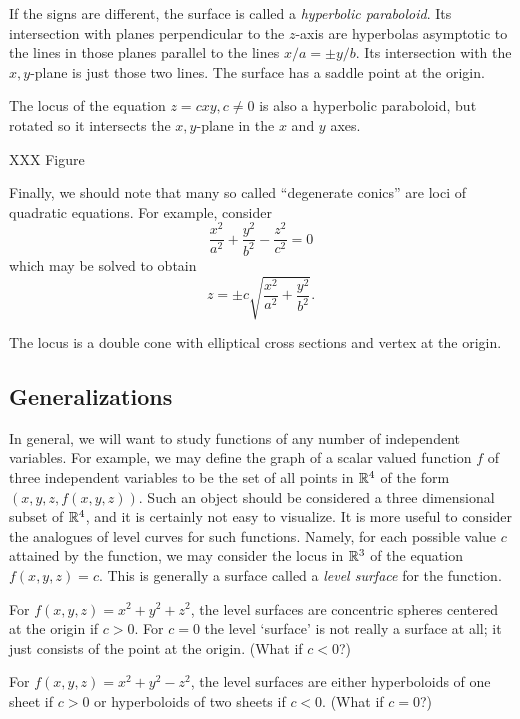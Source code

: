 If the signs are different, the surface is called a {\it
hyperbolic paraboloid}.  Its intersection with planes perpendicular
to the $z$-axis are hyperbolas asymptotic to the lines in
those planes parallel to the lines $x/a = \pm y/b$.   Its intersection
with the $x,y$-plane is just those two lines.  The surface has
a saddle point at the origin.


The locus of the equation $z = cxy, c\not= 0$ is also a hyperbolic
paraboloid, but rotated so it intersects the $x,y$-plane in the
$x$ and $y$ axes. 

XXX Figure

Finally, we should note that many so called ``degenerate conics''
are loci of quadratic equations.   For example, consider
\[
    \frac{x^2}{a^2} + \frac{y^2}{b^2} - \frac{z^2}{c^2} = 0
\]
which may be solved to obtain
\[
   z = \pm c\sqrt{\frac{x^2}{a^2} + \frac{y^2}{b^2}}. 
\]

The locus is a double cone with elliptical cross sections and
vertex at the origin.  

\subsection{Generalizations}
In general, we will want to study functions of any number of independent
variables.   For example, we may define the graph of a scalar valued
function $f$ of three independent variables to be the set of all points
in $\mathbb{R}^4$ of the form $(x,y,z,f(x,y,z))$.   Such an object
should be considered a three dimensional subset of $\mathbb{R}^4$, and it is
certainly not easy to visualize.  It is more useful to consider the
analogues of level curves for such functions.  Namely, for each
possible value $c$ attained by the function, we may consider the
locus in $\mathbb{R}^3$ of the equation $f(x,y,z) = c$.  This is generally
a surface called a \emph{level surface} for the function. 

\begin{example}
For $f(x, y, z) = x^2 + y^2 + z^2$, the level surfaces are
concentric spheres centered at the origin if $c > 0$.   For
$c = 0$ the level `surface' is not really a surface at all; it
just consists of the point at the origin.   (What if $c < 0$?) 

For $f(x,y,z) = x^2 + y^2 - z^2$, the level surfaces are either
hyperboloids of one sheet if $c > 0$ or hyperboloids of two sheets
if $c < 0$.  (What if $c = 0$?)
\end{example}

